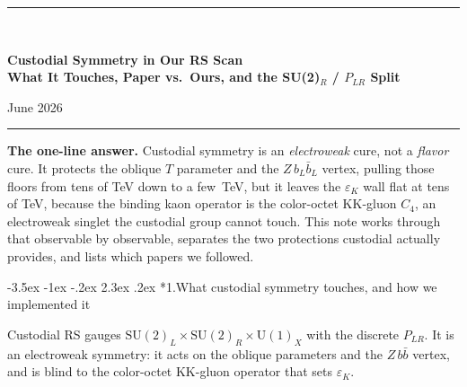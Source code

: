\documentclass[11pt]{article}
\makeatletter
\renewcommand\section{\@startsection{section}{1}{\z@}%
  {-3.5ex \@plus -1ex \@minus -.2ex}%
  {2.3ex \@plus.2ex}%
  {\normalfont\Large\bfseries\color{accent}}}
\makeatother
\begin{document}
\begin{center}
{\color{accent}\rule{\textwidth}{1.5pt}}\\[1.0em]
{\LARGE\bfseries Custodial Symmetry in Our RS Scan\\[0.3em]
What It Touches, Paper vs.\ Ours, and the SU(2)$_R$ / $P_{LR}$ Split\par}
\vspace{0.6em}
{\large June 2026\par}
\vspace{0.3em}
{\color{accent}\rule{\textwidth}{1.5pt}}
\end{center}
\vspace{0.6em}

\textbf{The one-line answer.} Custodial symmetry is an \emph{electroweak} cure, not a
\emph{flavor} cure. It protects the oblique $T$ parameter and the $Z\,b_L\bar b_L$
vertex, pulling those floors from tens of TeV down to a few~TeV, but it leaves the
$\varepsilon_K$ wall flat at tens of TeV, because the binding kaon operator is the
color-octet KK-gluon $C_4$, an electroweak singlet the custodial group cannot touch.
This note works through that observable by observable, separates the two protections
custodial actually provides, and lists which papers we followed.

\section*{1.\quad What custodial symmetry touches, and how we implemented it}

Custodial RS gauges $\mathrm{SU(2)}_L\times\mathrm{SU(2)}_R\times\mathrm{U(1)}_X$
with the discrete $P_{LR}$. It is an electroweak symmetry: it acts on the oblique
parameters and the $Z\,b\bar b$ vertex, and is blind to the color-octet KK-gluon
operator that sets $\varepsilon_K$.
\end{document}

